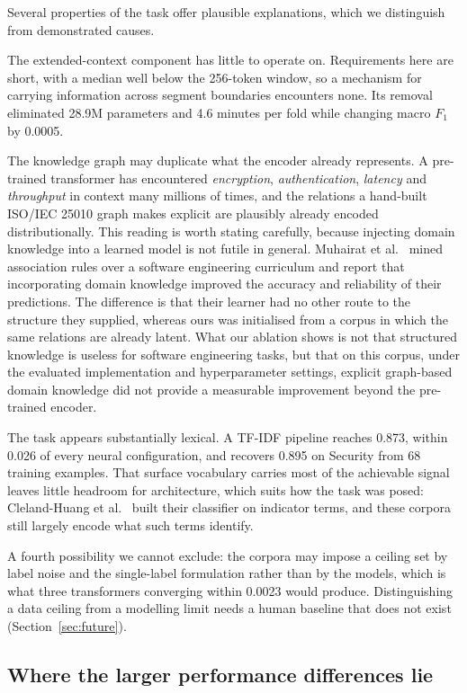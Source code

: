 \documentclass[11pt,a4paper]{article}
\begin{document}
Several properties of the task offer plausible explanations, which we distinguish from
demonstrated causes.

The extended-context component has little to operate on. Requirements here are short, with a
median well below the 256-token window, so a mechanism for carrying information across segment
boundaries encounters none. Its removal eliminated 28.9M parameters and 4.6 minutes per fold
while changing macro $F_1$ by 0.0005.

The knowledge graph may duplicate what the encoder already represents. A pre-trained
transformer has encountered \emph{encryption}, \emph{authentication}, \emph{latency} and
\emph{throughput} in context many millions of times, and the relations a hand-built
ISO/IEC 25010 graph makes explicit are plausibly already encoded distributionally. This
reading is worth stating carefully, because injecting domain knowledge into a learned model
is not futile in general. Muhairat et al.~\cite{muhairat2024} mined association rules over a
software engineering curriculum and report that incorporating domain knowledge improved the
accuracy and reliability of their predictions. The difference is that their learner had no
other route to the structure they supplied, whereas ours was initialised from a corpus in
which the same relations are already latent. What our ablation shows is not that structured knowledge is useless for software engineering
tasks, but that on this corpus, under the evaluated implementation and hyperparameter
settings, explicit graph-based domain knowledge did not provide a measurable improvement
beyond the pre-trained encoder.

The task appears substantially lexical. A TF-IDF pipeline reaches 0.873, within 0.026 of every
neural configuration, and recovers 0.895 on Security from 68 training examples. That surface
vocabulary carries most of the achievable signal leaves little headroom for architecture, which
suits how the task was posed: Cleland-Huang et al.~\cite{clelandhuang2007} built their
classifier on indicator terms, and these corpora still largely encode what such terms
identify.

A fourth possibility we cannot exclude: the corpora may impose a ceiling set by label noise and
the single-label formulation rather than by the models, which is what three transformers
converging within 0.0023 would produce. Distinguishing a data ceiling from a modelling limit
needs a human baseline that does not exist (Section~\ref{sec:future}).

\subsection{Where the larger performance differences lie}
\end{document}
